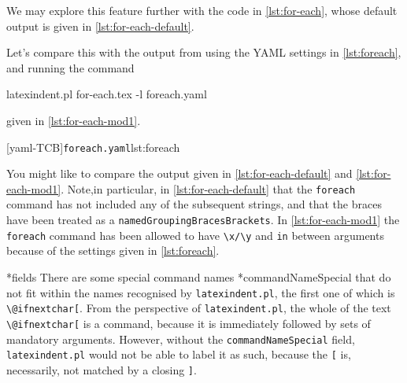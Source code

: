 \documentclass[10pt]{article}
\begin{document}
 \begin{example}
 We may explore this feature further with the code in \cref{lst:for-each}, whose default
 output is given in \cref{lst:for-each-default}.

 \begin{cmhtcbraster}[raster column skip=.1\linewidth]
 \end{cmhtcbraster}

 Let's compare this with the output from using the YAML settings in \cref{lst:foreach},
 and running the command 

 \begin{commandshell}
latexindent.pl for-each.tex -l foreach.yaml  
\end{commandshell}

 given in \cref{lst:for-each-mod1}.

 \begin{cmhtcbraster}[raster column skip=.1\linewidth]
  [yaml-TCB]{\texttt{foreach.yaml}}{lst:foreach}
 \end{cmhtcbraster}

 You might like to compare the output given in \cref{lst:for-each-default} and
 \cref{lst:for-each-mod1}. Note,in particular, in \cref{lst:for-each-default} that the
 \texttt{foreach} command has not included any of the subsequent strings, and that the
 braces have been treated as a \texttt{namedGroupingBracesBrackets}. In
 \cref{lst:for-each-mod1} the \texttt{foreach} command has been allowed to have
 \lstinline!\x/\y! and \texttt{in} between arguments because of the settings given in
 \cref{lst:foreach}.
 \end{example}

*{fields}
 There are some special command names *{commandNameSpecial} that do
 not fit within the names recognised by \texttt{latexindent.pl}, the first one of which
 is \lstinline!\@ifnextchar[!. From the perspective of \texttt{latexindent.pl}, the whole
 of the text \lstinline!\@ifnextchar[! is a command, because it is immediately followed
 by sets of mandatory arguments. However, without the \texttt{commandNameSpecial} field,
 \texttt{latexindent.pl} would not be able to label it as such, because the \lstinline![!
 is, necessarily, not matched by a closing \lstinline!]!.%
\end{document}
